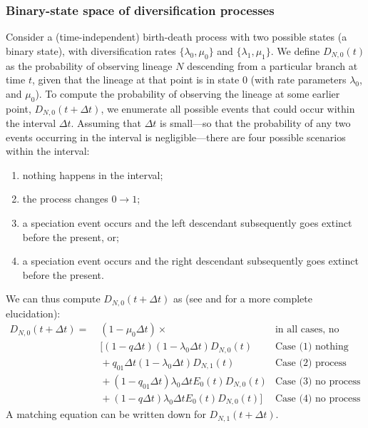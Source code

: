 \subsubsection{Binary-state space of diversification processes}
Consider a (time-independent) birth-death process with two possible states (\EG a binary state), with diversification rates $\{\lambda_0, \mu_0\}$ and $\{\lambda_1, \mu_1\}$.
We define $D_{N,0}(t)$ as the probability of observing lineage $N$ descending from a particular branch at time $t$, given that the lineage at that point is in state 0 (with rate parameters $\lambda_{0}$, and $\mu_{0}$).
To compute the probability of observing the lineage at some earlier point, $ D_{N,0}(t + \Delta t)$, we enumerate all possible events that could occur within the interval $\Delta t$.
Assuming that $\Delta t$ is small---so that the probability of any two events occurring in the interval is negligible---there are four possible scenarios within the interval:
\begin{enumerate}
	\item nothing happens in the interval;
	\item the process changes $0 \rightarrow 1$;
	\item a speciation event occurs and the left descendant subsequently goes extinct before the present, or;
	\item a speciation event occurs and the right descendant subsequently goes extinct before the present.
\end{enumerate}
We can thus compute $D_{N,0}(t + \Delta t)$ as (see \cite{Maddison2007} and \cite{FitzJohn2009} for a more complete elucidation):
\begin{align}
	D_{N,0}(t + \Delta t) = & \;(1 - \mu_0\Delta t) \times & \text{in all cases, no extinction of the observed lineage} \label{equation:ProbDeltaT} \\
			    		   & \;[  (1 - q\Delta t)(1 - \lambda_0\Delta t)D_{N,0}(t) & \text{Case (1) nothing happens} \nonumber\\
						   & \; + q_{01}\Delta t (1 - \lambda_0\Delta t)D_{N,1}(t) & \text{Case (2) process change but no speciation} \nonumber\\
						   & \; + (1 - q_{01}\Delta t)\lambda_0\Delta t E_0(t)D_{N,0}(t) & \text{Case (3) no process change, speciation, extinction} \nonumber\\
						   & \; + (1 - q\Delta t)\lambda_0\Delta t E_0(t)D_{N,0}(t)] & \text{Case (4) no process change, speciation, extinction} \nonumber
\end{align}
A matching equation can be written down for $D_{N,1}(t+\Delta t)$.

